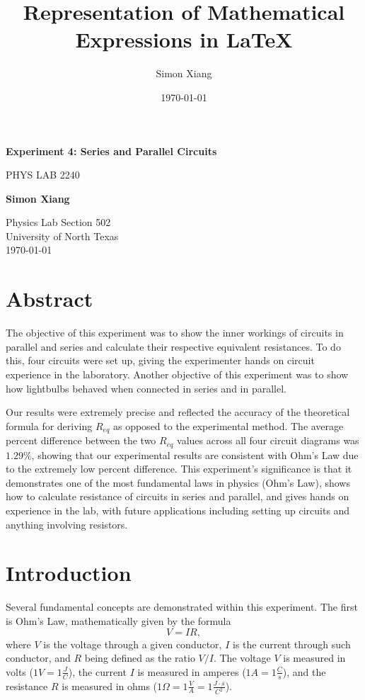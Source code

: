 \documentclass{article}
\title{Representation of Mathematical Expressions in \LaTeX}
\author{Simon Xiang}
\date{\today}
\theoremstyle{definition}
\begin{document}
\begin{titlepage}
    \begin{center}
        \vspace*{1cm}
 
        \Huge
        \textbf{Experiment 4: Series and Parallel Circuits}
 
        \vspace{0.5cm}
        \LARGE
        PHYS LAB 2240
 
        \vspace{1.5cm}
 
        \textbf{Simon Xiang}
 
        \vfill
  
        \vspace{0.8cm}
 
        \Large
        Physics Lab Section 502\\
        University of North Texas\\
        \today
 
    \end{center}
\end{titlepage}

\section{Abstract}
The objective of this experiment was to show the inner workings of circuits in parallel and series and calculate
their respective equivalent resistances. To do this, four circuits were set up, giving the experimenter hands on
circuit experience in the laboratory. Another objective of this experiment was to show how lightbulbs behaved when
connected in series and in parallel.

Our results were extremely precise and reflected the accuracy of the theoretical formula for deriving $R_{eq}$ as
opposed to the experimental method. The average percent difference between the two $R_{eq}$ values across all four 
circuit diagrams was $1.29\%$, showing that our experimental results are consistent with Ohm's Law due to the extremely
low percent difference. This experiment's significance is that it demonstrates one of the most fundamental laws in physics (Ohm's Law), 
shows how to calculate resistance of circuits in series and parallel, and gives hands on experience in the lab, with
future applications including setting up circuits and anything involving resistors.
\section{Introduction}
Several fundamental concepts are demonstrated within this experiment. The first is Ohm's Law, mathematically given 
by the formula
\begin{equation} \label{eq:1}
    V = IR, 
\end{equation}
where $V$ is the voltage through a given conductor, $I$ is the current through such conductor, and $R$ being defined as 
the ratio $V/I$. The voltage $V$ is measured in volts ($1 V = 1 \frac{J}{C}$), the current $I$ is measured in amperes ($1 A = 1 \frac{C}{s}$),
and the resistance $R$ is measured in ohms ($1 \Omega = 1 \frac{V}{A} = 1 \frac{J \cdot s}{C^2}$). 
\end{document}
